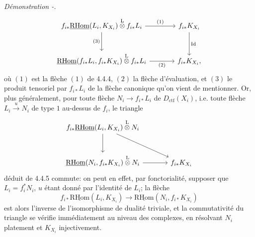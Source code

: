 \documentclass[11pt]{article}
\newenvironment{prooftext}[1][Proof]{\par\noindent\emph{#1.}\ }{\par\medskip}
\newcommand{\R}{\mathrm{R}}\newcommand{\RHomCore}{\mathrm{RHom}}
\providecommand{\RHom}{\RHomCore}
\providecommand{\uRHom}{\underline{\RHom}}
\providecommand{\Dctf}{D_{\mathrm{ctf}}}
\providecommand{\Id}{\mathrm{Id}}
\providecommand{\Dctf}{D_{\mathrm{ctf}}}
\providecommand{\RHom}{\RHomCore}
\providecommand{\RHom}{\R\mathcal{H}om}
\providecommand{\R}{\mathrm R}
\providecommand{\RHom}{\RHomCore}
\begin{document}
\begin{prooftext}[Démonstration -]
\begin{equation}
\begin{tikzcd}[column sep=large,row sep=large]
f_{i*}\uRHom(L_i,K_{X_i})\overset{\mathrm{L}}{\otimes} f_{i*}L_i
 \arrow[r,"(1)"] \arrow[d,"(3)"'] &
f_{i*}K_{X_i} \arrow[d,"\Id"]\\
\uRHom(f_{i*}L_i,f_{i*}K_{X_i})\overset{\mathrm{L}}{\otimes} f_{i*}L_i
 \arrow[r,"(2)"'] &
f_{i*}K_{X_i},
\end{tikzcd}
\end{equation}
où $(1)$ est la flèche $(1)$ de 4.4.4, $(2)$ la flèche d'évaluation, et $(3)$ le produit tensoriel par $f_{i*}L_i$ de la flèche canonique qu'on vient de mentionner. Or, plus généralement, pour toute flèche $N_i\longrightarrow f_{i*}L_i$ de $\Dctf(X_i)$, i.e. toute flèche $L_i\xrightarrow{u}N_i$ de type $1$ au-dessus de $f_i$, le triangle
\[
\begin{tikzcd}[column sep=large,row sep=large]
f_{i*}\uRHom(L_i,K_{X_i})\overset{\mathrm{L}}{\otimes}N_i
 \arrow[dr] \arrow[d] & \\
\uRHom(N_i,f_{i*}K_{X_i})\overset{\mathrm{L}}{\otimes}N_i \arrow[r] &
f_{i*}K_{X_i}
\end{tikzcd}
\]
déduit de 4.4.5 commute: on peut en effet, par fonctorialité, supposer que $L_i=f_i^*N_i$, $u$ étant donné par l'identité de $L_i$; la flèche
\[
f_{i*}\uRHom(L_i,K_{X_i})\longrightarrow\uRHom(N_i,f_{i*}K_{X_i})
\]
est alors l'inverse de l'isomorphisme de dualité triviale, et la commutativité du triangle se vérifie immédiatement au niveau des complexes, en résolvant $N_i$ platement et $K_{X_i}$ injectivement.


\end{prooftext}
\end{document}
